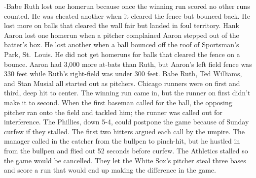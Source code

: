 \documentclass[
]{article}
\begin{document}
-Babe Ruth lost one homerun because once the winning run scored no other
runs counted. He was cheated another when it cleared the fence but
bounced back. He lost more on balls that cleared the wall fair but
landed in foul territory. Hank Aaron lost one homerun when a pitcher
complained Aaron stepped out of the batter's box. He lost another when a
ball bounced off the roof of Sportsman's Park, St.~Louis. He did not get
homeruns for balls that cleared the fence on a bounce. Aaron had 3,000
more at-bats than Ruth, but Aaron's left field fence was 330 feet while
Ruth's right-field was under 300 feet. Babe Ruth, Ted Williams, and Stan
Musial all started out as pitchers. Chicago runners were on first and
third, deep hit to center. The winning run came in, but the runner on
first didn't make it to second. When the first baseman called for the
ball, the opposing pitcher ran onto the field and tackled him; the
runner was called out for interference. The Phillies, down 5-4, could
postpone the game because of Sunday curfew if they stalled. The first
two hitters argued each call by the umpire. The manager called in the
catcher from the bullpen to pinch-hit, but he hustled in from the
bullpen and flied out 52 seconds before curfew. The Athletics stalled so
the game would be cancelled. They let the White Sox's pitcher steal
three bases and score a run that would end up making the difference in
the game.
\end{document}
